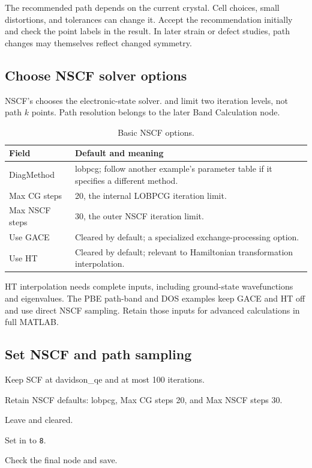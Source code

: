 The recommended path depends on the current crystal. Cell choices, small distortions, and tolerances can change it. Accept the recommendation initially and check the point labels in the result. In later strain or defect studies, path changes may themselves reflect changed symmetry.

\subsection{Choose NSCF solver options}

NSCF's  chooses the electronic-state solver.  and  limit two iteration levels, not path $k$ points. Path resolution belongs to the later Band Calculation node.

\begin{table}[htbp]
\centering
\caption{Basic NSCF options.}
\begin{tabularx}{\linewidth}{lX}
\toprule
Field & Default and meaning \\
\midrule
DiagMethod & lobpcg; follow another example's parameter table if it specifies a different method. \\
Max CG steps & 20, the internal LOBPCG iteration limit. \\
Max NSCF steps & 30, the outer NSCF iteration limit. \\
Use GACE & Cleared by default; a specialized exchange-processing option. \\
Use HT & Cleared by default; relevant to Hamiltonian transformation interpolation. \\
\bottomrule
\end{tabularx}
\end{table}

HT interpolation needs complete inputs, including ground-state wavefunctions and eigenvalues. The PBE path-band and DOS examples keep GACE and HT off and use direct NSCF sampling. Retain those inputs for advanced calculations in full MATLAB\regmark{}.

\subsection{Set NSCF and path sampling}

\begin{steps}
\item Keep SCF at davidson\_qe and at most 100 iterations.
\item Retain NSCF defaults: lobpcg, Max CG steps 20, and Max NSCF steps 30.
\item Leave  and  cleared.
\item Set \mbox{} in  to \texttt{8}.
\item Check the final  node and save.
\end{steps}

